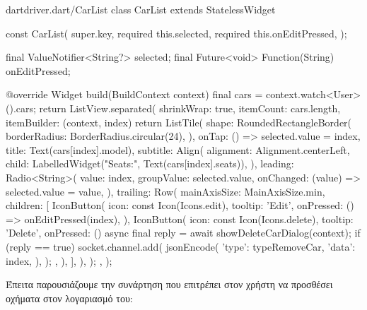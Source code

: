 \documentclass[../thesis.tex]{subfiles}
\begin{document}
\begin{codeblock}{dart}{driver.dart/CarList}
  class CarList extends StatelessWidget {
  const CarList({
    super.key,
    required this.selected,
    required this.onEditPressed,
  });

  final ValueNotifier<String?> selected;
  final Future<void> Function(String) onEditPressed;

  @override
  Widget build(BuildContext context) {
    final cars = context.watch<User>().cars;
    return ListView.separated(
      shrinkWrap: true,
      itemCount: cars.length,
      itemBuilder: (context, index) {
        return ListTile(
          shape: RoundedRectangleBorder(
            borderRadius: BorderRadius.circular(24),
          ),
          onTap: () => selected.value = index,
          title: Text(cars[index].model),
          subtitle: Align(
            alignment: Alignment.centerLeft,
            child: LabelledWidget("Seats:", Text(cars[index].seats)),
          ),
          leading: Radio<String>(
            value: index,
            groupValue: selected.value,
            onChanged: (value) => selected.value = value,
          ),
          trailing: Row(
            mainAxisSize: MainAxisSize.min,
            children: [
              IconButton(
                icon: const Icon(Icons.edit),
                tooltip: 'Edit',
                onPressed: () => onEditPressed(index),
              ),
              IconButton(
                icon: const Icon(Icons.delete),
                tooltip: 'Delete',
                onPressed: () async {
                  final reply = await showDeleteCarDialog(context);
                  if (reply == true) {
                    socket.channel.add(
                      jsonEncode({
                        'type': typeRemoveCar,
                        'data': index,
                      }),
                    );
                  }
                },
              ),
            ],
          ),
        );
      },
    );
  }
}
\end{codeblock}

Έπειτα παρουσιάζουμε την συνάρτηση που επιτρέπει στον χρήστη να προσθέσει οχήματα στον λογαριασμό του:
\end{document}
